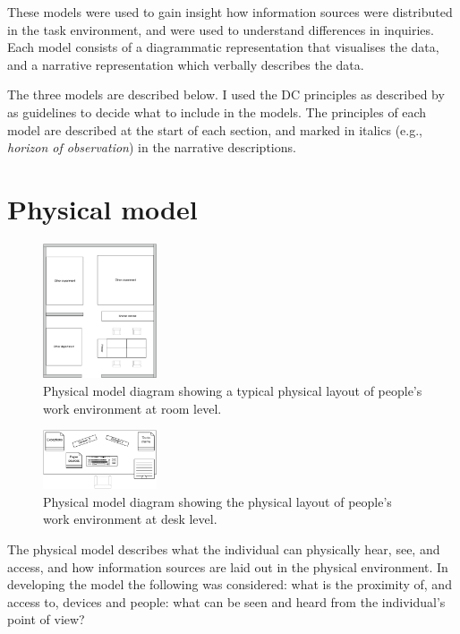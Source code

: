 These models were used to gain insight how information sources were distributed in the task environment, and were used to understand differences in inquiries. Each model consists of a diagrammatic representation that visualises the data, and a narrative representation which verbally describes the data. 

The three models are described below. I used the DC principles as described by \citep{Furniss2006} as guidelines to decide what to include in the models. The principles of each model are described at the start of each section, and marked in italics (e.g., \textit{horizon of observation}) in the narrative descriptions.

\section{Physical model}
\begin{figure}[!ht]
\centering
\includegraphics[width=0.3\textwidth]{images/ch12/ch12_physmodroom.pdf}
\caption[Study 2 Room model]{Physical model diagram showing a typical physical layout of people's work environment at room level.}
\vspace{-9pt}
\label{fig:ch12_physmodroom}
\end{figure}

\begin{figure}[!ht]
\centering
\includegraphics[width=0.3\textwidth]{images/ch12/ch12_physmoddesk.pdf}
\caption[Study 2 Desk model]{Physical model diagram showing the physical layout of people's work environment at desk level.}
\vspace{-9pt}
\label{fig:ch12_physmodroom}
\end{figure}

The physical model describes what the individual can physically hear, see, and access, and how information sources are laid out in the physical environment. In developing the model the following was considered: what is the proximity of, and access to, devices and people: what can be seen and heard from the individual's point of view?

